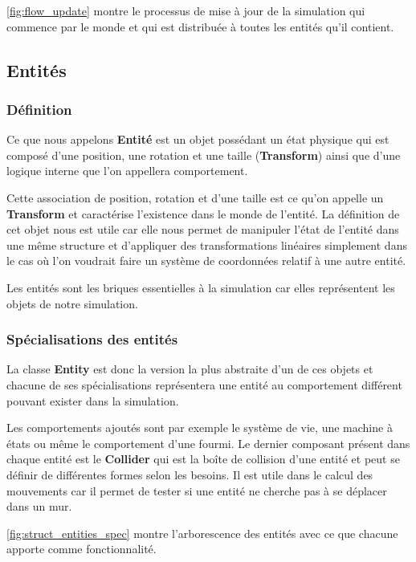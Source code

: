 \documentclass{EPUProjetDi}
\begin{document}
\autoref{fig:flow_update} montre le processus de mise à jour de la simulation qui commence  par le monde et 
qui est distribuée à toutes les entités qu'il contient.

\pagebreak
\subsection{Entités}

\subsubsection*{Définition}

Ce que nous appelons \textbf{Entité} est un objet possédant un état physique qui est composé d'une position, une rotation et une taille (\textbf{Transform}) 
ainsi que d'une logique interne que l'on appellera comportement.

Cette association de position, rotation et d'une taille est ce qu'on appelle un \textbf{Transform} et caractérise l'existence dans le monde de l'entité.
La définition de cet objet nous est utile car elle nous permet de manipuler l'état de l'entité dans une même structure et d'appliquer des transformations
linéaires simplement dans le cas où l'on voudrait faire un système de coordonnées relatif à une autre entité.

Les entités sont les briques essentielles à la simulation car elles représentent les objets de notre simulation. 

\subsubsection*{Spécialisations des entités}

La classe \textbf{Entity} est donc la version la plus abstraite d'un de ces objets et chacune de ses spécialisations
représentera une entité au comportement différent pouvant exister dans la simulation.

Les comportements ajoutés sont par exemple le système de vie, une machine à états ou même le comportement d'une fourmi.
Le dernier composant présent dans chaque entité est le \textbf{Collider} qui est la boîte de collision d'une entité et peut se définir 
de différentes formes selon les besoins. Il est utile dans le calcul des mouvements car il permet de tester si une entité ne cherche pas 
à se déplacer dans un mur.

\autoref{fig:struct_entities_spec} montre l'arborescence des entités avec ce que chacune apporte comme fonctionnalité.
\end{document}
